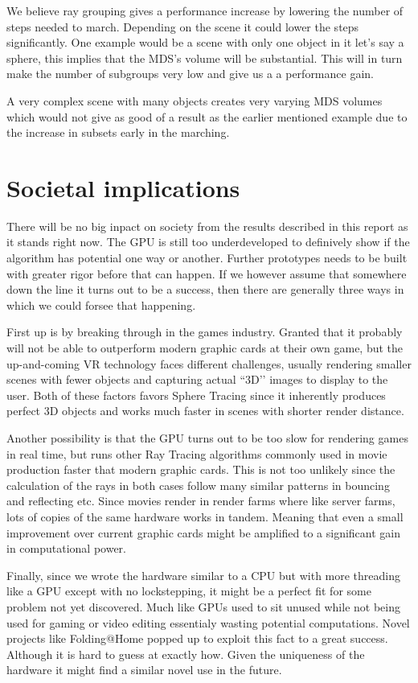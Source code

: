 			We believe ray grouping gives a performance increase by lowering
			the number of steps needed to march. Depending on the scene it
			could lower the steps significantly. One example would be a scene
			with only one object in it let's say a sphere, this implies that
			the MDS's volume will be substantial. This will in turn make the
			number of subgroups very low and give us a a performance gain. 
			
			A very complex scene with many objects creates very varying MDS
			volumes which would not give as good of a result as the earlier
			mentioned example due to the increase in subsets early in the
			marching.

	\section{Societal implications}

		There will be no big inpact on society from the results described in
		this report as it stands right now. The GPU is still too underdeveloped
		to definively show if the algorithm has potential one way or another.
		Further prototypes needs to be built with greater rigor before that can
		happen.  If we however assume that somewhere down the line it turns out
		to be a success, then there are generally three ways in which we could
		forsee that happening.

		First up is by breaking through in the games industry. Granted that it
		probably will not be able to outperform modern graphic cards at their
		own game, but the up-and-coming VR technology faces different
		challenges, usually rendering smaller scenes with fewer objects and
		capturing actual ``3D’’ images to display to the user. Both of these
		factors favors Sphere Tracing since it inherently produces perfect 3D
		objects and works much faster in scenes with shorter render distance.

		Another possibility is that the GPU turns out to be too slow for
		rendering games in real time, but runs other Ray Tracing algorithms
		commonly used in movie production faster that modern graphic cards.
		This is not too unlikely since the calculation of the rays in both
		cases follow many similar patterns in bouncing and reflecting etc.
		Since movies render in render farms where like server farms, lots of
		copies of the same hardware works in tandem. Meaning that even a small
		improvement over current graphic cards might be amplified to a
		significant gain in computational power.

		Finally, since we wrote the hardware similar to a CPU but with more
		threading like a GPU except with no lockstepping, it might be a perfect
		fit for some problem not yet discovered. Much like GPUs used to sit
		unused while not being used for gaming or video editing essentialy
		wasting potential computations. Novel projects like
		Folding@Home\cite{Beberg2009} popped up to exploit this fact to a great
		success. Although it is hard to guess at exactly how. Given the
		uniqueness of the hardware it might find a similar novel use in the
		future.
